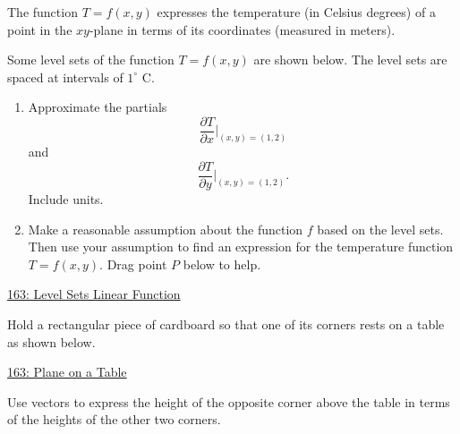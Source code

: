 \documentclass{ximera}
\begin{document}
\begin{question} \label{Qkdf3r3f00}
The function $T = f(x,y)$ expresses the temperature (in Celsius degrees) of a point in the $xy$-plane in terms of its coordinates (measured in meters).

Some level sets of the function $T=f(x,y)$ are shown below. The level sets are spaced at intervals of $1^\circ$ C.

\begin{enumerate}
\item Approximate the partials 
\[
   \frac{\partial T}{\partial x}\Big|_{(x,y) = (1,2)}
\]
and
\[
   \frac{\partial T}{\partial y}\Big|_{(x,y) = (1,2)}.
\]
Include units.

\item Make a reasonable assumption about the function $f$ based on the level sets. Then use your assumption to find an expression for the temperature function $T=f(x,y)$. Drag point $P$ below to help.
\end{enumerate}

\begin{onlineOnly}
    \begin{center}
\end{center}
\end{onlineOnly}

\href{https://www.desmos.com/calculator/9ofxjbrege}{163: Level Sets Linear Function}

\end{question}

\begin{question} \label{ExMD3fetet3933}
Hold a rectangular piece of cardboard so that one of its corners rests on a table as shown below.

\begin{onlineOnly}
    \begin{center}
\end{center}
\end{onlineOnly}

\href{https://www.desmos.com/3d/zehmvpiqvo}{163: Plane on a Table}

Use vectors to express the height of the opposite corner above the table in terms of the heights of the other two corners.

\end{question}
\end{document}
